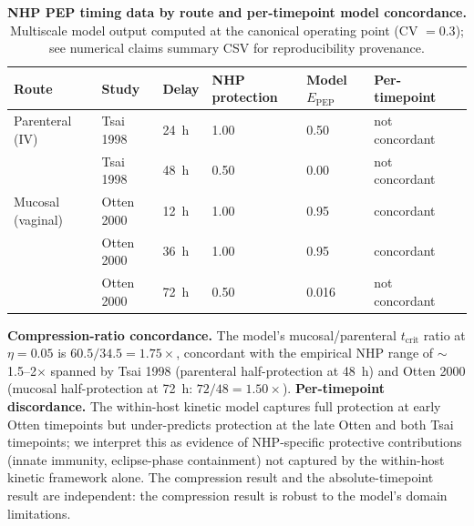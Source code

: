 \documentclass[10pt,letterpaper]{article}
\theoremstyle{definition}
\theoremstyle{remark}
\newcommand{\Epep}{E_{\text{PEP}}}
\newcommand{\tcrit}{t_{\text{crit}}}
\begin{document}
\begin{table}[!ht]
\centering
\caption{\textbf{NHP PEP timing data by route and per-timepoint model concordance.} Multiscale model output computed at the canonical operating point (CV $= 0.3$); see numerical claims summary CSV for reproducibility provenance.}
\label{tab:nhp}
\small
\begin{tabular}{@{}llllllc@{}}
\toprule
\textbf{Route} & \textbf{Study} & \textbf{Delay} & \textbf{NHP protection} & \textbf{Model $\Epep$} & \textbf{Per-timepoint} \\
\midrule
Parenteral (IV)   & Tsai 1998\cite{tsai1995}    & 24~h & 1.00 & 0.50 & not concordant \\
                  & Tsai 1998                   & 48~h & 0.50 & 0.00 & not concordant \\
Mucosal (vaginal) & Otten 2000\cite{otten2000}  & 12~h & 1.00 & 0.95 & concordant \\
                  & Otten 2000                  & 36~h & 1.00 & 0.95 & concordant \\
                  & Otten 2000                  & 72~h & 0.50 & 0.016 & not concordant \\
\bottomrule
\end{tabular}

\vspace{0.3em}
\footnotesize
\textbf{Compression-ratio concordance.} The model's mucosal/parenteral $\tcrit$ ratio at $\eta = 0.05$ is $60.5/34.5 = 1.75\times$, concordant with the empirical NHP range of $\sim$1.5--2$\times$ spanned by Tsai 1998 (parenteral half-protection at 48~h) and Otten 2000 (mucosal half-protection at 72~h: $72/48 = 1.50\times$). \textbf{Per-timepoint discordance.} The within-host kinetic model captures full protection at early Otten timepoints but under-predicts protection at the late Otten and both Tsai timepoints; we interpret this as evidence of NHP-specific protective contributions (innate immunity, eclipse-phase containment) not captured by the within-host kinetic framework alone. The compression result and the absolute-timepoint result are independent: the compression result is robust to the model's domain limitations.
\end{table}
\end{document}
